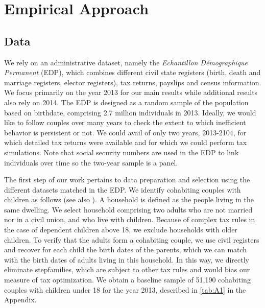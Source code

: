 \section{Empirical Approach}
\subsection{Data}
We rely on an administrative dataset, namely the \emph{Echantillon Démographique Permanent} (EDP), which combines different civil state registers (birth, death and marriage registers, elector registers), tax returns, payslips and census information. We focus primarily on the year 2013 for our main results while additional results also rely on 2014. The EDP is designed as a random sample of the population based on birthdate, comprising 2.7 million individuals in 2013. Ideally, we would like to follow couples over many years to check the extent to which inefficient behavior is persistent or not. We could avail of only two years, 2013-2104, for which detailed tax returns were available and for which we could perform tax simulations. Note that social security numbers are used in the EDP to link individuals over time so the two-year sample is a panel. 

The first step of our work pertains to data preparation and selection using the different datasets matched in the EDP. We identify cohabiting couples with children as follows (see also \citet{costemalle2017donnees}). A household is defined as the people living in the same dwelling. We select household comprising two adults who are not married nor in a civil union, and who live with children. Because of complex tax rules in the case of dependent children above 18, we exclude households with older children. To verify that the adults form a cohabiting couple, we use civil registers and recover for each child the birth dates of the parents, which we can match with the birth dates of adults living in this household. In this way, we directly eliminate stepfamilies, which are subject to other tax rules and would bias our measure of tax optimization. We obtain a baseline sample of 51,190 cohabiting couples with children under 18 for the year 2013, described in \autoref{tab:A1} 
in the Appendix.

